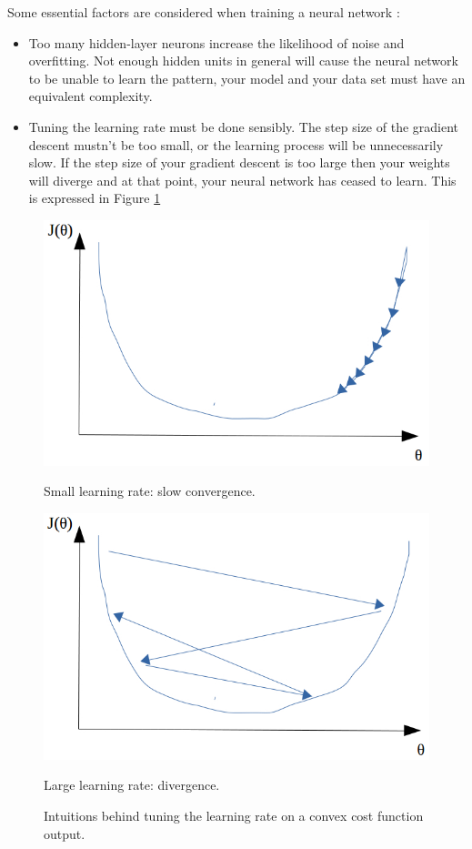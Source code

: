 \documentclass[a4paper,12pt, oneside]{memoir}
\begin{document}
Some essential factors are considered when training a neural network \cite{deeplearning4j}:

\begin{itemize}
  \item Too many hidden-layer neurons increase the likelihood of noise and overfitting. Not enough hidden units in general will cause the neural network to be unable to learn the pattern, your model and your data set must have an equivalent complexity.
  \item Tuning the learning rate must be done sensibly. The step size of the gradient descent mustn't be too small, or the learning process will be unnecessarily slow. If the step size of your gradient descent is too large then your weights will diverge and at that point, your neural network has ceased to learn. This is expressed in Figure \ref{learning-rates-examples}
\end{itemize}

\begin{figure}[h]
  \centering
  \begin{minipage}[h]{0.45\textwidth}
    \includegraphics[scale=0.3]{slow_convergence}
    \caption{Small learning rate: slow convergence.}
  \end{minipage}
  \hfill
  \begin{minipage}[h]{0.45\textwidth}
    \includegraphics[scale=0.3]{divergence}
    \caption{Large learning rate: divergence.}
  \end{minipage}
  \caption{Intuitions behind tuning the learning rate on a convex cost function output.}
  \label{learning-rates-examples}
\end{figure}
\end{document}
